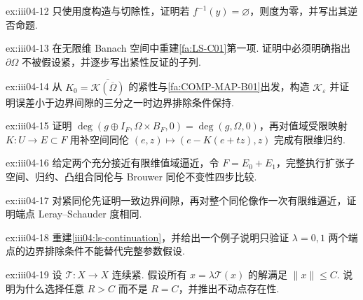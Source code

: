 \begin{FAExercise}[非零度蕴含解的存在]{ex:iii04-12}
只使用度构造与切除性，证明若 \(\displaystyle f^{-1}(y)=\varnothing\)，则度为零，并写出其逆否命题.
\end{FAExercise}

\begin{FAExercise}[紧扰动边界间隙]{ex:iii04-13}
在无限维 Banach 空间中重建\autoref{fa:LS-C01}第一项. 证明中必须明确指出 \(\displaystyle\partial\Omega\) 不被假设紧，并逐步写出紧性反证的子列.
\end{FAExercise}

\begin{FAExercise}[有限维紧映射逼近]{ex:iii04-14}
从 \(\displaystyle K_0=\overline{\mathcal K(\overline\Omega)}\) 的紧性与\autoref{fa:COMP-MAP-B01}出发，构造 \(\displaystyle\mathcal K_{\varepsilon}\) 并证明误差小于边界间隙的三分之一时边界排除条件保持.
\end{FAExercise}

\begin{FAExercise}[稳定化与归约]{ex:iii04-15}
证明 \(\displaystyle\deg(g\oplus I_F,\Omega\times B_F,0)=\deg(g,\Omega,0)\)，再对值域受限映射 \(\displaystyle K:U\to E\subset F\) 用补空间同伦 \(\displaystyle(e,z)\mapsto(e-K(e+tz),z)\) 完成有限维归约.
\end{FAExercise}

\begin{FAExercise}[LS 逼近选择无关性]{ex:iii04-16}
给定两个充分接近有限维值域逼近，令 \(\displaystyle F=E_0+E_1\)，完整执行扩张子空间、归约、凸组合同伦与 Brouwer 同伦不变性四步比较.
\end{FAExercise}

\begin{FAExercise}[LS 同伦不变性]{ex:iii04-17}
对紧同伦先证明一致边界间隙，再对整个同伦像作一次有限维逼近，证明端点 Leray--Schauder 度相同.
\end{FAExercise}

\begin{FAExercise}[延拓原理]{ex:iii04-18}
重建\autoref{iii04:ls-continuation}，并给出一个例子说明只验证 \(\displaystyle\lambda=0,1\) 两个端点的边界排除条件不能替代完整参数假设.
\end{FAExercise}

\begin{FAExercise}[先验界准则]{ex:iii04-19}
设 \(\displaystyle\mathcal T:X\to X\) 连续紧. 假设所有 \(\displaystyle x=\lambda\mathcal T(x)\) 的解满足 \(\displaystyle\|x\|\leqslant C\). 说明为什么选择任意 \(\displaystyle R>C\) 而不是 \(\displaystyle R=C\)，并推出不动点存在性.
\end{FAExercise}

